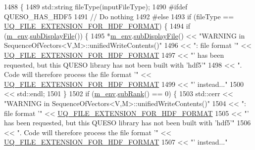 \begin{DoxyCode}
1488 \{ 
1489   std::string fileType(inputFileType);
1490 \textcolor{preprocessor}{#ifdef QUESO\_HAS\_HDF5}
1491 \textcolor{preprocessor}{}  \textcolor{comment}{// Do nothing}
1492 \textcolor{preprocessor}{#else}
1493 \textcolor{preprocessor}{}  \textcolor{keywordflow}{if} (fileType == \hyperlink{_defines_8h_a4ebcc075277d031eb97c90b9a45f4493}{UQ\_FILE\_EXTENSION\_FOR\_HDF\_FORMAT}) \{
1494     \textcolor{keywordflow}{if} (\hyperlink{class_q_u_e_s_o_1_1_base_vector_sequence_a8e8824d2a63c5a43bcc6473e3a0491e8}{m\_env}.\hyperlink{class_q_u_e_s_o_1_1_base_environment_a8a0064746ae8dddfece4229b9ad374d6}{subDisplayFile}()) \{
1495       *\hyperlink{class_q_u_e_s_o_1_1_base_vector_sequence_a8e8824d2a63c5a43bcc6473e3a0491e8}{m\_env}.\hyperlink{class_q_u_e_s_o_1_1_base_environment_a8a0064746ae8dddfece4229b9ad374d6}{subDisplayFile}() << \textcolor{stringliteral}{"WARNING in
       SequenceOfVectors<V,M>::unifiedWriteContents()"}
1496                               << \textcolor{stringliteral}{": file format '"} << 
      \hyperlink{_defines_8h_a4ebcc075277d031eb97c90b9a45f4493}{UQ\_FILE\_EXTENSION\_FOR\_HDF\_FORMAT}
1497                               << \textcolor{stringliteral}{"' has been requested, but this QUESO library has not been built with
       'hdf5'"}
1498                               << \textcolor{stringliteral}{". Code will therefore process the file format '"} << 
      \hyperlink{_defines_8h_a4ebcc075277d031eb97c90b9a45f4493}{UQ\_FILE\_EXTENSION\_FOR\_HDF\_FORMAT}
1499                               << \textcolor{stringliteral}{"' instead..."}
1500                               << std::endl;
1501     \}
1502     \textcolor{keywordflow}{if} (\hyperlink{class_q_u_e_s_o_1_1_base_vector_sequence_a8e8824d2a63c5a43bcc6473e3a0491e8}{m\_env}.\hyperlink{class_q_u_e_s_o_1_1_base_environment_a172d52f993f1322ed45aaddf71518dbb}{subRank}() == 0) \{
1503       std::cerr << \textcolor{stringliteral}{"WARNING in SequenceOfVectors<V,M>::unifiedWriteContents()"}
1504                 << \textcolor{stringliteral}{": file format '"} << \hyperlink{_defines_8h_a4ebcc075277d031eb97c90b9a45f4493}{UQ\_FILE\_EXTENSION\_FOR\_HDF\_FORMAT}
1505                 << \textcolor{stringliteral}{"' has been requested, but this QUESO library has not been built with 'hdf5'"}
1506                 << \textcolor{stringliteral}{". Code will therefore process the file format '"} << 
      \hyperlink{_defines_8h_a4ebcc075277d031eb97c90b9a45f4493}{UQ\_FILE\_EXTENSION\_FOR\_HDF\_FORMAT}
1507                 << \textcolor{stringliteral}{"' instead..."}

\end{DoxyCode}
